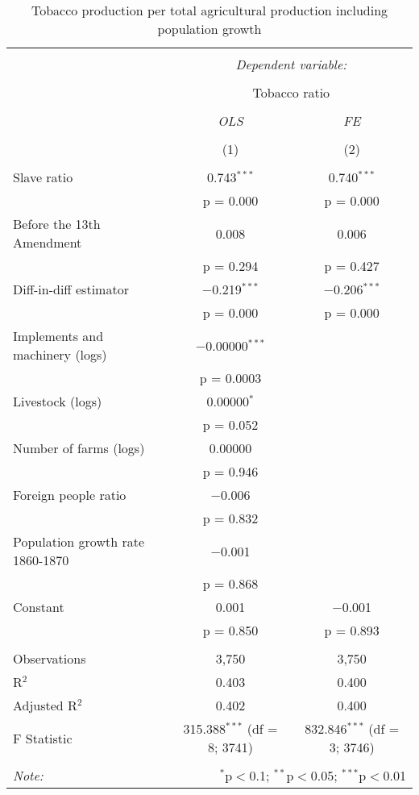 \documentclass[12pt]{report}
\begin{document}
\begin{table}[!htbp] \centering 
  \caption{Tobacco production per total agricultural production including population growth} 
  \label{tab:tob} 
\begin{tabular}{@{\extracolsep{5pt}}lcc} 
\\[-1.8ex]\hline 
\hline \\[-1.8ex] 
 & \multicolumn{2}{c}{\textit{Dependent variable:}} \\ 
\cline{2-3} 
\\[-1.8ex] & \multicolumn{2}{c}{Tobacco ratio} \\ 
\\[-1.8ex] & \textit{OLS} & \textit{FE} \\ 
\\[-1.8ex] & (1) & (2)\\ 
\hline \\[-1.8ex] 
 Slave ratio & 0.743$^{***}$ & 0.740$^{***}$ \\ 
  & p = 0.000 & p = 0.000 \\ 
  Before the 13th Amendment & 0.008 & 0.006 \\ 
  & p = 0.294 & p = 0.427 \\ 
  Diff-in-diff estimator & $-$0.219$^{***}$ & $-$0.206$^{***}$ \\ 
  & p = 0.000 & p = 0.000 \\ 
  Implements and machinery (logs) & $-$0.00000$^{***}$ &  \\ 
  & p = 0.0003 &  \\ 
  Livestock (logs) & 0.00000$^{*}$ &  \\ 
  & p = 0.052 &  \\ 
  Number of farms (logs) & 0.00000 &  \\ 
  & p = 0.946 &  \\ 
  Foreign people ratio & $-$0.006 &  \\ 
  & p = 0.832 &  \\ 
  Population growth rate 1860-1870 & $-$0.001 &  \\ 
  & p = 0.868 &  \\ 
  Constant & 0.001 & $-$0.001 \\ 
  & p = 0.850 & p = 0.893 \\ 
 \hline \\[-1.8ex] 
Observations & 3,750 & 3,750 \\ 
R$^{2}$ & 0.403 & 0.400 \\ 
Adjusted R$^{2}$ & 0.402 & 0.400 \\ 
F Statistic & 315.388$^{***}$ (df = 8; 3741) & 832.846$^{***}$ (df = 3; 3746) \\ 
\hline 
\hline \\[-1.8ex] 
\textit{Note:}  & \multicolumn{2}{r}{$^{*}$p$<$0.1; $^{**}$p$<$0.05; $^{***}$p$<$0.01} \\ 
\end{tabular} 
\end{table} 
\end{document}
